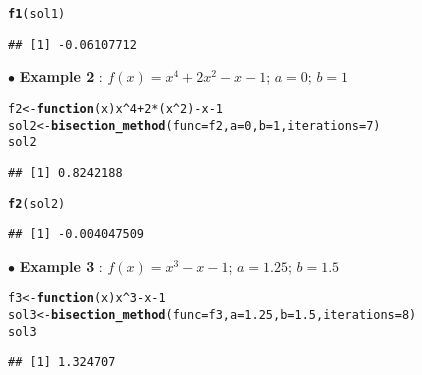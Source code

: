\documentclass[11pt, a4paper]{article}\usepackage[]{graphicx}\usepackage[]{xcolor}
\makeatletter
\newcommand{\hlnum}[1]{\textcolor[rgb]{0.686,0.059,0.569}{#1}}%
\newcommand{\hlopt}[1]{\textcolor[rgb]{0,0,0}{#1}}%
\newcommand{\hldef}[1]{\textcolor[rgb]{0.345,0.345,0.345}{#1}}%
\newcommand{\hlkwa}[1]{\textcolor[rgb]{0.161,0.373,0.58}{\textbf{#1}}}%
\newcommand{\hlkwb}[1]{\textcolor[rgb]{0.69,0.353,0.396}{#1}}%
\newcommand{\hlkwc}[1]{\textcolor[rgb]{0.333,0.667,0.333}{#1}}%
\newcommand{\hlkwd}[1]{\textcolor[rgb]{0.737,0.353,0.396}{\textbf{#1}}}%
\newenvironment{kframe}{%
 \def\at@end@of@kframe{}%
 \ifinner\ifhmode%
  \def\at@end@of@kframe{\end{minipage}}%
  \begin{minipage}{\columnwidth}%
 \fi\fi%
 \def\FrameCommand##1{\hskip\@totalleftmargin \hskip-\fboxsep
 \colorbox{shadecolor}{##1}\hskip-\fboxsep
     \hskip-\linewidth \hskip-\@totalleftmargin \hskip\columnwidth}%
 \MakeFramed {\advance\hsize-\width
   \@totalleftmargin\z@ \linewidth\hsize
   \@setminipage}}%
 {\par\unskip\endMakeFramed%
 \at@end@of@kframe}
\newenvironment{knitrout}{}{} %
\makeatother
\begin{document}
\begin{knitrout}\footnotesize
{}\color{fgcolor}\begin{kframe}
\begin{alltt}
\hlkwd{f1}\hldef{(sol1)}
\end{alltt}
\begin{verbatim}
## [1] -0.06107712
\end{verbatim}
\end{kframe}
\end{knitrout}

$\bullet$ \textbf{Example 2} : $f(x) = x^4 + 2x^2 - x - 1$; $a = 0$; $b = 1$

\begin{knitrout}\footnotesize
{}\color{fgcolor}\begin{kframe}
\begin{alltt}
\hldef{f2} \hlkwb{<-} \hlkwa{function}\hldef{(}\hlkwc{x}\hldef{) x}\hlopt{^}\hlnum{4} \hlopt{+} \hlnum{2}\hlopt{*}\hldef{(x}\hlopt{^}\hlnum{2}\hldef{)} \hlopt{-} \hldef{x} \hlopt{-} \hlnum{1}
\hldef{sol2} \hlkwb{<-} \hlkwd{bisection_method}\hldef{(}\hlkwc{func} \hldef{= f2,} \hlkwc{a} \hldef{=} \hlnum{0}\hldef{,} \hlkwc{b} \hldef{=} \hlnum{1}\hldef{,} \hlkwc{iterations} \hldef{=} \hlnum{7}\hldef{)}
\hldef{sol2}
\end{alltt}
\begin{verbatim}
## [1] 0.8242188
\end{verbatim}
\end{kframe}
\end{knitrout}

\begin{knitrout}\footnotesize
{}\color{fgcolor}\begin{kframe}
\begin{alltt}
\hlkwd{f2}\hldef{(sol2)}
\end{alltt}
\begin{verbatim}
## [1] -0.004047509
\end{verbatim}
\end{kframe}
\end{knitrout}

$\bullet$ \textbf{Example 3} : $f(x) = x^3 - x - 1$; $a = 1.25$; $b = 1.5$

\begin{knitrout}\footnotesize
{}\color{fgcolor}\begin{kframe}
\begin{alltt}
\hldef{f3} \hlkwb{<-} \hlkwa{function}\hldef{(}\hlkwc{x}\hldef{) x}\hlopt{^}\hlnum{3} \hlopt{-} \hldef{x} \hlopt{-} \hlnum{1}
\hldef{sol3} \hlkwb{<-} \hlkwd{bisection_method}\hldef{(}\hlkwc{func} \hldef{= f3,} \hlkwc{a} \hldef{=} \hlnum{1.25}\hldef{,} \hlkwc{b} \hldef{=} \hlnum{1.5}\hldef{,} \hlkwc{iterations} \hldef{=} \hlnum{8}\hldef{)}
\hldef{sol3}
\end{alltt}
\begin{verbatim}
## [1] 1.324707
\end{verbatim}
\end{kframe}
\end{knitrout}
\end{document}
